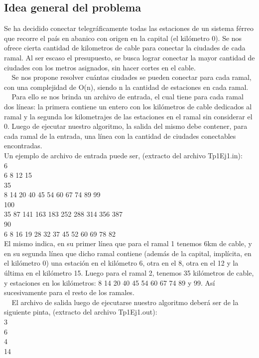 \subsection{Idea general del problema}
Se ha decidido conectar telegráficamente todas las estaciones de un sistema férreo que recorre el país en abanico con origen en la capital (el kilómetro 0). Se nos ofrece cierta cantidad de kilometros de cable para conectar la ciudades de cada ramal. Al ser escaso el presupuesto, se busca lograr conectar la mayor cantidad de ciudades con los metros asignados, sin hacer cortes en el cable. \\
$~~~~~$Se nos propone resolver cuántas ciudades se pueden conectar para cada ramal, con una complejidad de O(n), siendo n la cantidad de estaciones en cada ramal.\\
$~~~~~$Para ello se nos brinda un archivo de entrada, el cual tiene para cada ramal dos líneas: la primera contiene un entero con los kilómetros de cable dedicados al ramal y la segunda los kilometrajes de las estaciones en el ramal sin considerar el 0. Luego de ejecutar nuestro algoritmo, la salida del mismo debe contener, para cada ramal de la entrada, una línea con la cantidad de ciudades conectables encontradas.\\

Un ejemplo de archivo de entrada puede ser, (extracto del archivo Tp1Ej1.in):\\
6 \\
6 8 12 15 \\
35 \\
8 14 20 40 45 54 60 67 74 89 99 \\
100 \\
35 87 141 163 183 252 288 314 356 387 \\
90 \\
6 8 16 19 28 32 37 45 52 60 69 78 82 \\

El mismo indica, en su primer línea que para el ramal 1 tenemos 6km de cable, y en su segunda línea que dicho ramal contiene (además de la capital, implícita, en el kilómetro 0) una estación en el kilómetro 6, otra en el 8, otra en el 12 y la última en el kilómetro 15. Luego para el ramal 2, tenemos 35 kilómetros de cable, y estaciones en los kilómetros: 8 14 20 40 45 54 60 67 74 89 y 99. Así sucesivamente para el resto de los ramales.\\
$~~~~~$El archivo de salida luego de ejecutarse nuestro algoritmo deberá ser de la siguiente pinta, (extracto del archivo Tp1Ej1.out):\\
3 \\
6 \\
4 \\
14 \\


